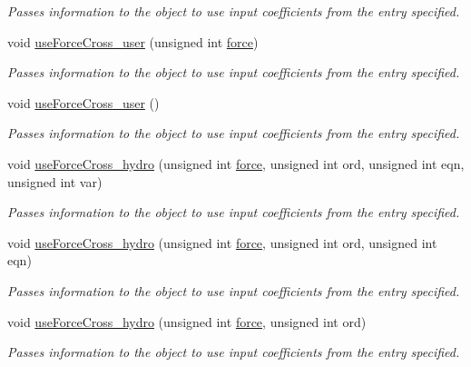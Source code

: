 \begin{DoxyCompactItemize}
\begin{DoxyCompactList}\small\item\em Passes information to the object to use input coefficients from the entry specified. \end{DoxyCompactList}\item 
void \hyperlink{classosea_1_1ofreq_1_1_motion_model_af629a294d6f304b0357a514c9cf5dcf9}{use\-Force\-Cross\-\_\-user} (unsigned int \hyperlink{input__syntax_8dox_ab0a92c70357da47fe86696522eab7dc8}{force})
\begin{DoxyCompactList}\small\item\em Passes information to the object to use input coefficients from the entry specified. \end{DoxyCompactList}\item 
void \hyperlink{classosea_1_1ofreq_1_1_motion_model_a9858717cea37d004dd02a5906225d765}{use\-Force\-Cross\-\_\-user} ()
\begin{DoxyCompactList}\small\item\em Passes information to the object to use input coefficients from the entry specified. \end{DoxyCompactList}\item 
void \hyperlink{classosea_1_1ofreq_1_1_motion_model_abfd6e4a22ec23d7ee462adb737fab3f2}{use\-Force\-Cross\-\_\-hydro} (unsigned int \hyperlink{input__syntax_8dox_ab0a92c70357da47fe86696522eab7dc8}{force}, unsigned int ord, unsigned int eqn, unsigned int var)
\begin{DoxyCompactList}\small\item\em Passes information to the object to use input coefficients from the entry specified. \end{DoxyCompactList}\item 
void \hyperlink{classosea_1_1ofreq_1_1_motion_model_a6f745d15ee67cafd2943e016166a7f51}{use\-Force\-Cross\-\_\-hydro} (unsigned int \hyperlink{input__syntax_8dox_ab0a92c70357da47fe86696522eab7dc8}{force}, unsigned int ord, unsigned int eqn)
\begin{DoxyCompactList}\small\item\em Passes information to the object to use input coefficients from the entry specified. \end{DoxyCompactList}\item 
void \hyperlink{classosea_1_1ofreq_1_1_motion_model_ab85d9879e0af7e035aa90d264a28095e}{use\-Force\-Cross\-\_\-hydro} (unsigned int \hyperlink{input__syntax_8dox_ab0a92c70357da47fe86696522eab7dc8}{force}, unsigned int ord)
\begin{DoxyCompactList}\small\item\em Passes information to the object to use input coefficients from the entry specified. \end{DoxyCompactList}\item 

\end{DoxyCompactItemize}
